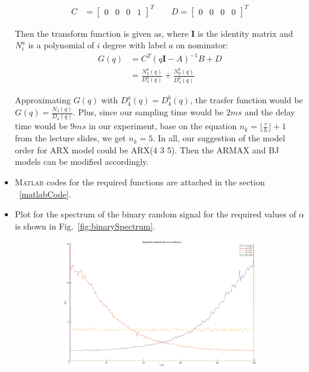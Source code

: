 \documentclass[10pt,a4paper]{article}
\begin{document}
\begin{itemize}
\begin{align}
		C &= \begin{bmatrix} 0 & 0 & 0 & 1 \end{bmatrix}^{T} \qquad D = \begin{bmatrix} 0 & 0 & 0 & 0 \end{bmatrix}^{T}
	\end{align}
	\par Then the transform function is given as, where $\mathbf{I}$ is the identity matrix and $N^{a}_{i}$ is a polynomial of $i$ degree with label $a$ on nominator:
	\begin{align}
		G(q) &= C^{T}(q \mathbf{I} - A)^{-1}B + D \\
		&= \frac{N^{a}_{3}(q)}{D^{a}_{4}(q)} + \frac{N^{b}_{0}(q)}{D^{b}_{4}(q)}
	\end{align}
	\par Approximating $G(q)$ with $D^{a}_{4}(q) = D^{b}_{4}(q)$, the trasfer function would be $G(q) = \frac{N_{3}(q)}{D_{4}(q)}$. Plus, since our sampling time would be $2ms$ and the delay time would be $9ms$ in our experiment, base on the equation $n_{k} = \lfloor\frac{\tau}{h}\rfloor + 1$ from the lecture slides, we get $n_{k} = 5$. In all, our suggestion of the model order for ARX model could be ARX(4 3 5). Then the ARMAX and BJ models can be modified accordingly.
    \item \textsc{Matlab} codes for the required functions are attached in the section ~\ref{matlabCode}.
    \item Plot for the spectrum of the binary random signal for the required values of $\alpha$ is shown in Fig.~\ref{fig:binarySpectrum}.
	\begin{figure}[ht]
		\footnotesize
		\centering 
		\begin{subfigure}[t]{.49\linewidth}
		\includegraphics[width=\columnwidth]{spectrumAlpha.eps} 

\end{subfigure}
\end{figure}
\end{itemize}
\end{document}
